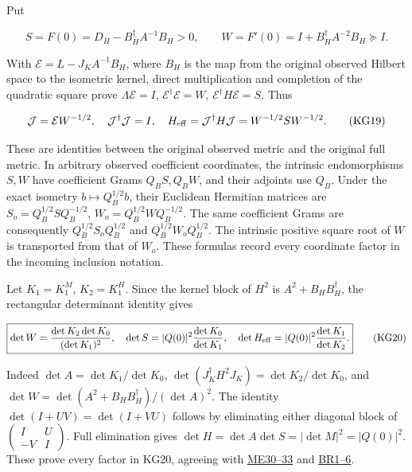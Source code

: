 \documentclass[11pt]{article}
\begin{document}
Put

\[
S=F(0)=D_H-B_H^\dagger A^{-1}B_H>0,
\qquad W=F'(0)=I+B_H^\dagger A^{-2}B_H\succeq I.
\tag{KG18}
\]

With \(\mathcal E=L-J_KA^{-1}B_H\), where \(B_H\) is the map from the original observed Hilbert space to the isometric kernel, direct multiplication and completion of the quadratic square prove \(\Lambda\mathcal E=I\), \(\mathcal E^\dagger\mathcal E=W\), \(\mathcal E^\dagger H\mathcal E=S\). Thus

\[
\mathcal J=\mathcal EW^{-1/2},\quad
\mathcal J^\dagger\mathcal J=I,\quad H_{\rm eff}=\mathcal J^\dagger H\mathcal J=W^{-1/2}SW^{-1/2}.
\tag{KG19}
\]

These are identities between the original observed metric and the original full metric. In arbitrary observed coefficient coordinates, the intrinsic endomorphisms \(S,W\) have coefficient Grams \(Q_BS,Q_BW\), and their adjoints use \(Q_B\). Under the exact isometry \(b\mapsto Q_B^{1/2}b\), their Euclidean Hermitian matrices are \(S_o=Q_B^{1/2}SQ_B^{-1/2}\), \(W_o=Q_B^{1/2}WQ_B^{-1/2}\). The same coefficient Grams are consequently \(Q_B^{1/2}S_oQ_B^{1/2}\) and \(Q_B^{1/2}W_oQ_B^{1/2}\). The intrinsic positive square root of \(W\) is transported from that of \(W_o\). These formulas record every coordinate factor in the incoming inclusion notation.

Let \(K_1=K_1^M\), \(K_2=K_1^H\). Since the kernel block of \(H^2\) is \(A^2+B_HB_H^\dagger\), the rectangular determinant identity gives

\[
\boxed{\det W=\frac{\det K_2\det K_0}{(\det K_1)^2},\quad
\det S=|Q(0)|^2\frac{\det K_0}{\det K_1},\quad
\det H_{\rm eff}=|Q(0)|^2\frac{\det K_1}{\det K_2}.}
\tag{KG20}
\]

Indeed \(\det A=\det K_1/\det K_0\), \(\det(J_K^\dagger H^2J_K)=\det K_2/\det K_0\), and \(\det W=\det(A^2+B_HB_H^\dagger)/(\det A)^2\). The identity \(\det(I+UV)=\det(I+VU)\) follows by eliminating either diagonal block of \(\left(\begin{smallmatrix}I&U\\-V&I\end{smallmatrix}\right)\). Full elimination gives \(\det H=\det A\det S=|\det M|^2=|Q(0)|^2\). These prove every factor in KG20, agreeing with \href{https://github.com/KokunoYumeto/zeta-function-research-reader/blob/d44d94aa43d0a1934455ddac008368583f43a2c1/workbenches/splitzero-tandem/continuations/20260921-canonical-memory-filters/MEMORY_ENERGY_PROOFS.md}{ME30--33} and \href{https://github.com/KokunoYumeto/zeta-function-research-reader/blob/d44d94aa43d0a1934455ddac008368583f43a2c1/workbenches/splitzero-tandem/continuations/20260921-canonical-memory-filters/PROGRAMME_RECEIVERS.md}{BR1--6}.
\end{document}
